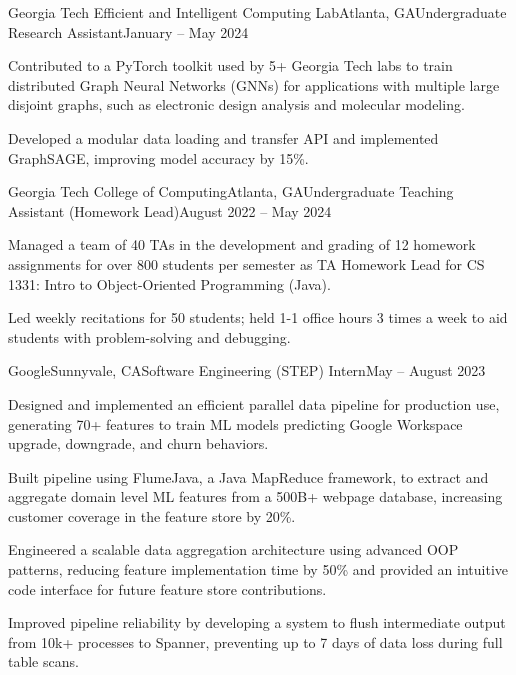 \documentclass{article}
\begin{document}
\begin{flushleft}
    \begin{experience}{Georgia Tech Efficient and Intelligent Computing Lab}{Atlanta, GA}{Undergraduate Research Assistant}{January -- May 2024}
        \item Contributed to a PyTorch toolkit used by 5+ Georgia Tech labs to train distributed Graph Neural Networks (GNNs) for applications with multiple large disjoint graphs, such as electronic design analysis and molecular modeling.
        \item Developed a modular data loading and transfer API and implemented GraphSAGE, improving model accuracy by 15\%.
    \end{experience}

    \begin{experience}{Georgia Tech College of Computing}{Atlanta, GA}{Undergraduate Teaching Assistant (Homework Lead)}{August 2022 -- May 2024}
        \item Managed a team of 40 TAs in the development and grading of 12 homework assignments for over 800 students per semester as TA Homework Lead for CS 1331: Intro to Object-Oriented Programming (Java).
        \item Led weekly recitations for 50 students; held 1-1 office hours 3 times a week to aid students with problem-solving and debugging.
    \end{experience}

    \begin{experience}{Google}{Sunnyvale, CA}{Software Engineering (STEP) Intern}{May -- August 2023}
        \item Designed and implemented an efficient parallel data pipeline for production use, generating 70+ features to train ML models predicting Google Workspace upgrade, downgrade, and churn behaviors.
        \item Built pipeline using FlumeJava, a Java MapReduce framework, to extract and aggregate domain level ML features from a 500B+ webpage database, increasing customer coverage in the feature store by 20\%.
        \item Engineered a scalable data aggregation architecture using advanced OOP patterns, reducing feature implementation time by 50\% and provided an intuitive code interface for future feature store contributions.
        \item Improved pipeline reliability by developing a system to flush intermediate output from 10k+ processes to Spanner, preventing up to 7 days of data loss during full table scans.
    \end{experience}


\end{flushleft}
\end{document}
